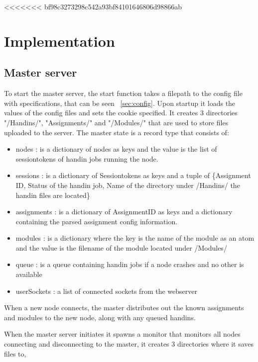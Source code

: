 <<<<<<< bf98c3273298c542a93bf84101646806d98866ab
\section{Implementation}
\subsection{Master server}
To start the master server, the start function takes a filepath to the config file with specifications, that can be seen ~\ref{sec:config}. Upon startup it loads the values of the config files and sets the cookie specified. It creates 3 directories "/Handins/", "Assignments/" and "/Modules/" that are used to store files uploaded to the server. The master state is a record type that consists of:
\begin{itemize}
\item nodes : is a dictionary of nodes as keys and the value is the list of sessiontokens of handin jobs running the node.
\item sessions : is a dictionary of Sessiontokens as keys and a tuple of \{Assignment ID, Status of the handin job, Name of the directory under /Handins/ the handin files are located\}
\item assignments : is a dictionary of AssignmentID as keys and a dictionary containing the parsed assignment config information.
\item modules : is a dictionary where the key is the name of the module as an atom and the value is the filename of the module located under /Modules/
\item queue : is a queue containing handin jobs if a node crashes and no other is available
\item userSockets : a list of connected sockets from the webserver
\end{itemize}

When a new node connects, the master distributes out the known assignments and modules to the new node, along with any queued handins.









When the master server initiates it spawns a monitor that monitors all nodes connecting and disconnecting to the master, it creates 3 directories where it saves files to,












